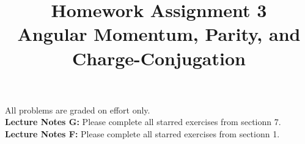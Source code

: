 \documentclass[12pt]{article}
\begin{document}
\date{\vspace{-5ex}}

\title{Homework Assignment 3 \\ Angular Momentum, Parity, and Charge-Conjugation}

\maketitle

\noindent
All problems are graded on effort only.\\

\noindent
{\bf Lecture Notes G:} Please complete all starred exercises from
sectionn 7.\\

\noindent
{\bf Lecture Notes F:} Please complete all starred exercises from
sectionn 1.\\
\end{document}
